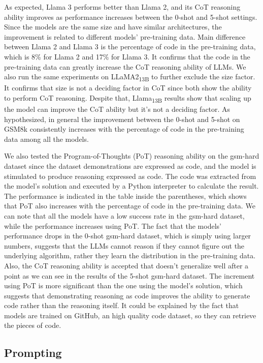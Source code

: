 As expected, Llama 3 performs better than Llama 2, and its CoT reasoning ability improves as performance increases between the 0-shot and 5-shot settings.
Since the models are the same size and have similar architectures, the improvement is related to different models' pre-training data.
Main difference between Llama 2 and Llama 3 is the percentage of code in the pre-training data, which is 8\% for Llama 2 and 17\% for Llama 3.
It confirms that the code in the pre-training data can greatly increase the CoT reasoning ability of LLMs.
We also run the same experiments on LLaMA2\textsubscript{13B} to further exclude the size factor.
It confirms that size is not a deciding factor in CoT since both show the ability to perform CoT reasoning.
Despite that, Llama\textsubscript{13B} results show that scaling up the model can improve the CoT ability but it's not a deciding factor.
As hypothesized, in general the improvement between the 0-shot and 5-shot on GSM8k consistently increases with the percentage of code in the pre-training data among all the models.

We also tested the Program-of-Thoughts (PoT) reasoning ability on the gsm-hard dataset since the dataset demonstrations are expressed as code, and the model is stimulated to produce reasoning expressed as code.
The code was extracted from the model's solution and executed by a Python interpreter to calculate the result.
The performance is indicated in the table inside the parentheses, which shows that PoT also increases with the percentage of code in the pre-training data.
We can note that all the models have a low success rate in the gsm-hard dataset, while the performance increases using PoT\@.
The fact that the models' performance drops in the 0-shot gsm-hard dataset, which is simply using larger numbers, suggests that the LLMs cannot reason if they cannot figure out the underlying algorithm, rather they learn the distribution in the pre-training data.
Also, the CoT reasoning ability is accepted that doesn’t generalize well after a point as we can see in the results of the 5-shot gsm-hard dataset.
The increment using PoT is more significant than the one using the model's solution, which suggests that demonstrating reasoning as code improves the ability to generate code rather than the reasoning itself.
It could be explained by the fact that models are trained on GitHub, an high quality code dataset, so they can retrieve the pieces of code.

\subsection{Prompting}
\label{subsec:prompting}

